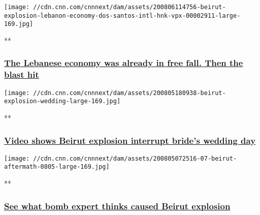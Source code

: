 \href{/videos/business/2020/08/06/beirut-explosion-lebanon-economy-dos-santos-intl-hnk-vpx.cnn/video/playlists/beirut-explosion/}{}

\texttt{[image: //cdn.cnn.com/cnnnext/dam/assets/200806114756-beirut-explosion-lebanon-economy-dos-santos-intl-hnk-vpx-00002911-large-169.jpg]}

**

\hypertarget{the-lebanese-economy-was-already-in-free-fall-then-the-blast-hit}{%
\subsubsection{\texorpdfstring{\href{/videos/business/2020/08/06/beirut-explosion-lebanon-economy-dos-santos-intl-hnk-vpx.cnn/video/playlists/beirut-explosion/}{The
Lebanese economy was already in free fall. Then the blast
hit}}{The Lebanese economy was already in free fall. Then the blast hit}}\label{the-lebanese-economy-was-already-in-free-fall-then-the-blast-hit}}

\href{/videos/world/2020/08/05/beirut-explosion-wedding-video-zw-orig.cnn/video/playlists/beirut-explosion/}{}

\texttt{[image: //cdn.cnn.com/cnnnext/dam/assets/200805180938-beirut-explosion-wedding-large-169.jpg]}

**

\hypertarget{video-shows-beirut-explosion-interrupt-brides-wedding-day}{%
\subsubsection{\texorpdfstring{\href{/videos/world/2020/08/05/beirut-explosion-wedding-video-zw-orig.cnn/video/playlists/beirut-explosion/}{Video
shows Beirut explosion interrupt bride's wedding
day}}{Video shows Beirut explosion interrupt bride's wedding day}}\label{video-shows-beirut-explosion-interrupt-brides-wedding-day}}

\href{/videos/world/2020/08/05/ammonium-nitrate-beirut-lebanon-explosion-sam-kiley-pkg-vpx.cnn/video/playlists/beirut-explosion/}{}

\texttt{[image: //cdn.cnn.com/cnnnext/dam/assets/200805072516-07-beirut-aftermath-0805-large-169.jpg]}

**

\hypertarget{see-what-bomb-expert-thinks-caused-beirut-explosion}{%
\subsubsection{\texorpdfstring{\href{/videos/world/2020/08/05/ammonium-nitrate-beirut-lebanon-explosion-sam-kiley-pkg-vpx.cnn/video/playlists/beirut-explosion/}{See
what bomb expert thinks caused Beirut
explosion}}{See what bomb expert thinks caused Beirut explosion}}\label{see-what-bomb-expert-thinks-caused-beirut-explosion}}

